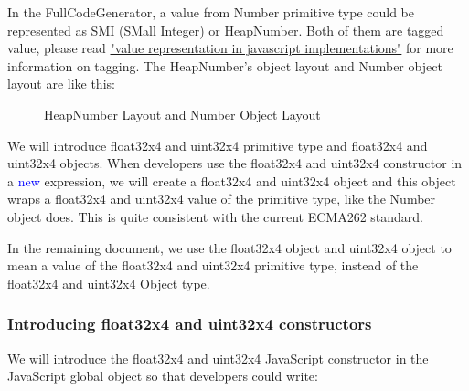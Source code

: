 \documentclass[12pt]{article} %
\begin{document}
In the FullCodeGenerator, a value from Number primitive type could be
represented as SMI (SMall Integer) or HeapNumber. Both of them are tagged
value, please read
\href{http://wingolog.org/archives/2011/05/18/value-representation-in-javascript-implementations}{"value
representation in javascript implementations"} for more information on tagging.
The HeapNumber's object layout and Number object layout are like this:

\mbox{}

\begin{figure}[h!]
\centering
{}
\caption{HeapNumber Layout and Number Object Layout}
\label{fig:layout}
\end{figure}

\mbox{}

We will introduce float32x4 and uint32x4 primitive type and float32x4 and
uint32x4 objects. When developers use the float32x4 and uint32x4 constructor in
a \textcolor{blue}{new} expression, we will create a float32x4 and uint32x4
object and this object wraps a float32x4 and uint32x4 value of the primitive
type, like the Number object does. This is quite consistent with the current
ECMA262 standard.

In the remaining document, we use the float32x4 object and uint32x4 object to
mean a value of the float32x4 and uint32x4 primitive type, instead of the
float32x4 and uint32x4 Object type.

\subsubsection{Introducing float32x4 and uint32x4 constructors}
We will introduce the float32x4 and uint32x4 JavaScript constructor in the JavaScript global object so that developers could write:
\end{document}
